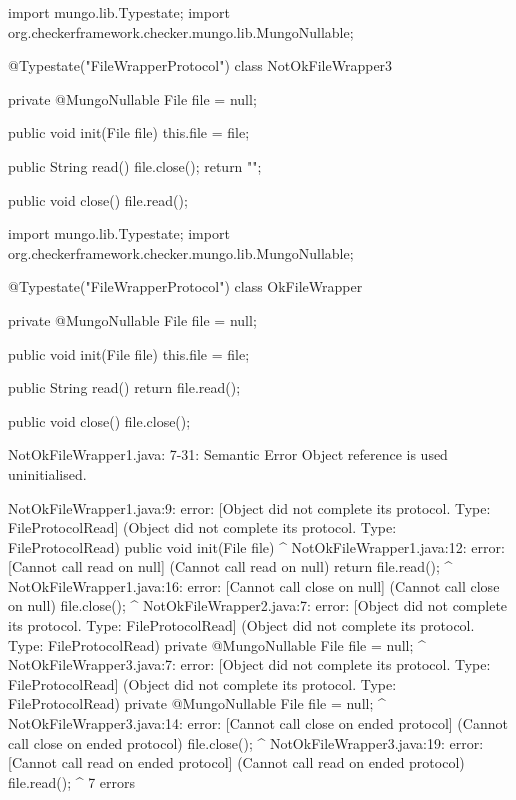 \begin{code}
import mungo.lib.Typestate;
import org.checkerframework.checker.mungo.lib.MungoNullable;

@Typestate("FileWrapperProtocol")
class NotOkFileWrapper3 {

  private @MungoNullable File file = null;

  public void init(File file) {
    this.file = file;
  }

  public String read() {
    file.close();
    return "";
  }

  public void close() {
    file.read();
  }

}\end{code}

\begin{code}
import mungo.lib.Typestate;
import org.checkerframework.checker.mungo.lib.MungoNullable;

@Typestate("FileWrapperProtocol")
class OkFileWrapper {

  private @MungoNullable File file = null;

  public void init(File file) {
    this.file = file;
  }

  public String read() {
    return file.read();
  }

  public void close() {
    file.close();
  }

}\end{code}

\lstset{language=,caption=Original Mungo output}
\begin{code}

NotOkFileWrapper1.java: 7-31: Semantic Error
		Object reference is used uninitialised.
\end{code}

\lstset{language=,caption=New Mungo output}
\begin{code}
NotOkFileWrapper1.java:9: error: [Object did not complete its protocol. Type: FileProtocol{Read}] (Object did not complete its protocol. Type: FileProtocol{Read})
  public void init(File file) {}
                        ^
NotOkFileWrapper1.java:12: error: [Cannot call read on null] (Cannot call read on null)
    return file.read();
                    ^
NotOkFileWrapper1.java:16: error: [Cannot call close on null] (Cannot call close on null)
    file.close();
              ^
NotOkFileWrapper2.java:7: error: [Object did not complete its protocol. Type: FileProtocol{Read}] (Object did not complete its protocol. Type: FileProtocol{Read})
  private @MungoNullable File file = null;
                              ^
NotOkFileWrapper3.java:7: error: [Object did not complete its protocol. Type: FileProtocol{Read}] (Object did not complete its protocol. Type: FileProtocol{Read})
  private @MungoNullable File file = null;
                              ^
NotOkFileWrapper3.java:14: error: [Cannot call close on ended protocol] (Cannot call close on ended protocol)
    file.close();
              ^
NotOkFileWrapper3.java:19: error: [Cannot call read on ended protocol] (Cannot call read on ended protocol)
    file.read();
             ^
7 errors
\end{code}

